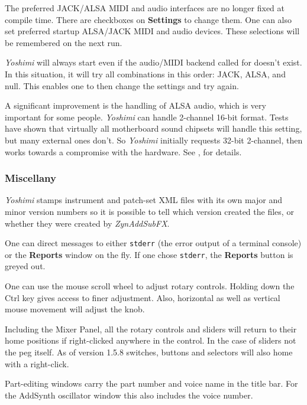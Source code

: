 \documentclass[
 11pt,
 twoside,
 a4paper,
 final                                 %
]{article}
\begin{document}
   The preferred JACK/ALSA MIDI and audio interfaces are no longer fixed at
   compile time. There are checkboxes on \textbf{Settings} to change them.
   One can also set preferred startup ALSA/JACK MIDI and audio devices.
   These selections will be remembered on the next run.

   \textsl{Yoshimi} will always start even if the audio/MIDI backend called
   for doesn't exist. In this situation, it will try all combinations in this
   order: JACK, ALSA, and null. This enables one to then change the settings
   and try again.

   A significant improvement is the handling of ALSA audio, which is very
   important for some people.  \textsl{Yoshimi} can handle 2-channel 16-bit
   format. Tests have shown that virtually all motherboard sound chipsets will
   handle this setting, but many external ones don't.  So \textsl{Yoshimi}
   initially requests 32-bit 2-channel, then works towards a compromise with the
   hardware.
   See , for details.

\subsubsection{Miscellany}
\label{subsubsec:new_features_miscellany}

   \textsl{Yoshimi} stamps instrument and patch-set XML files with its own
   major and minor version numbers so it is possible to tell which version
   created the files, or whether they were created by \textsl{ZynAddSubFX}.

   One can direct messages to either \texttt{stderr}
   (the error output of a terminal console) or the \textbf{Reports} window
   on the fly. If one chose \texttt{stderr}, the \textbf{Reports} button is
   greyed out.

   One can use the mouse scroll wheel to adjust rotary controls. Holding
   down the Ctrl key gives access to finer adjustment.  Also, horizontal as
   well as vertical mouse movement will adjust the knob.

   Including the Mixer Panel, all the rotary controls and sliders will return
   to their home positions if right-clicked anywhere in the control. In the case
   of sliders not the peg itself. As of version 1.5.8 switches, buttons and
   selectors will also home with a right-click.

   Part-editing windows carry the part number and voice name in the title bar.
   For the AddSynth oscillator window this also includes the voice number.
\end{document}
